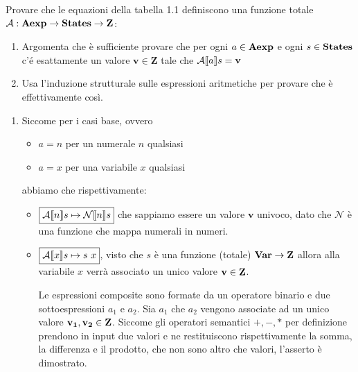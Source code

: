 {Provare che le equazioni della tabella 1.1 definiscono una funzione totale $\mathcal{A}:\mbox{\textbf{Aexp}} \rightarrow \mbox{\textbf{States}} \rightarrow \mbox{\textbf{Z}}$: 
	\begin{enumerate}
		\item Argomenta che è sufficiente provare che per ogni $a \in \mbox{\textbf{Aexp}}$ e ogni $s \in \mbox{\textbf{States}}$
		c'é esattamente un valore $\mathbf{v} \in \mathbf{Z}$ tale che $\mathcal{A} \llbracket a \rrbracket s = \mathbf{v}$
		\item Usa l'induzione strutturale sulle espressioni aritmetiche per provare che è effettivamente
		così.
	\end{enumerate}
}
{
	\begin{enumerate}
		\item Siccome per i casi base, ovvero
		\begin{itemize}
			\item $\boxed{a = n}$ per un numerale $n$ qualsiasi
			\item $\boxed{a = x}$ per una variabile $x$ qualsiasi
		\end{itemize} 
		abbiamo che rispettivamente:
		\begin{itemize}
			\item $\boxed{\mathcal{A} \llbracket n \rrbracket s \mapsto \mathcal{N} \llbracket n \rrbracket s}$ che sappiamo essere un valore $\mathbf{v}$ univoco, dato che $\mathcal{N}$ è una funzione che mappa numerali in numeri.
			\item $\boxed{\mathcal{A} \llbracket x \rrbracket s \mapsto s\mbox{ } x}$, visto che $s$ è una funzione (totale) $\mbox{\textbf{Var}} \rightarrow \mbox{\textbf{Z}}$  allora
			alla variabile $x$ verrà associato un unico valore $\mathbf{v} \in \mbox{\textbf{Z}}$.
			
			Le espressioni composite sono formate da un operatore binario e due sottoespressioni
			$a_1$ e $a_2$.
			Sia $a_1$ che $a_2$ vengono associate ad un unico valore $\mathbf{v_1}, \mathbf{v_2} \in \mbox{\textbf{Z}}$.
			Siccome gli operatori semantici $+, -, *$ per definizione prendono in input due
			valori e ne restituiscono rispettivamente la somma, la differenza e il prodotto, che
			non sono altro che valori, l'asserto è dimostrato.
		

\end{itemize}
\end{enumerate}}
